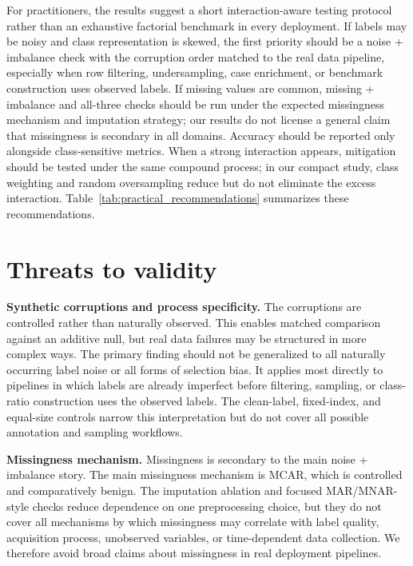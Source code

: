 \documentclass[preprint,12pt,number]{elsarticle}
\begin{document}
For practitioners, the results suggest a short interaction-aware testing protocol rather than an exhaustive factorial benchmark in every deployment. If labels may be noisy and class representation is skewed, the first priority should be a noise + imbalance check with the corruption order matched to the real data pipeline, especially when row filtering, undersampling, case enrichment, or benchmark construction uses observed labels. If missing values are common, missing + imbalance and all-three checks should be run under the expected missingness mechanism and imputation strategy; our results do not license a general claim that missingness is secondary in all domains. Accuracy should be reported only alongside class-sensitive metrics. When a strong interaction appears, mitigation should be tested under the same compound process; in our compact study, class weighting and random oversampling reduce but do not eliminate the excess interaction. Table~\ref{tab:practical_recommendations} summarizes these recommendations.




\section{Threats to validity}

\textbf{Synthetic corruptions and process specificity.} The corruptions are controlled rather than naturally observed. This enables matched comparison against an additive null, but real data failures may be structured in more complex ways. The primary finding should not be generalized to all naturally occurring label noise or all forms of selection bias. It applies most directly to pipelines in which labels are already imperfect before filtering, sampling, or class-ratio construction uses the observed labels. The clean-label, fixed-index, and equal-size controls narrow this interpretation but do not cover all possible annotation and sampling workflows.

\textbf{Missingness mechanism.} Missingness is secondary to the main noise + imbalance story. The main missingness mechanism is MCAR, which is controlled and comparatively benign. The imputation ablation and focused MAR/MNAR-style checks reduce dependence on one preprocessing choice, but they do not cover all mechanisms by which missingness may correlate with label quality, acquisition process, unobserved variables, or time-dependent data collection. We therefore avoid broad claims about missingness in real deployment pipelines.
\end{document}
